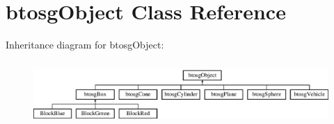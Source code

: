 \hypertarget{classbtosgObject}{}\section{btosg\+Object Class Reference}
\label{classbtosgObject}
Inheritance diagram for btosg\+Object\+:\begin{figure}[H]
\begin{center}
\leavevmode
\includegraphics[height=2.448980cm]{classbtosgObject}
\end{center}
\end{figure}
